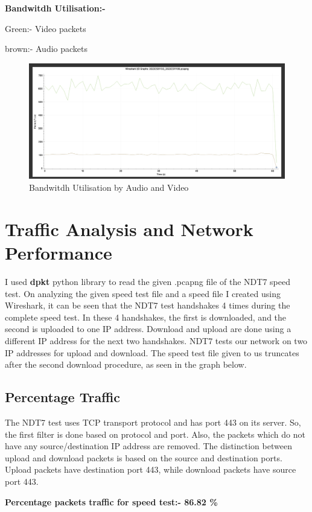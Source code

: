\documentclass{article}
\begin{document}
\textbf{Bandwitdh Utilisation:-}

Green:- Video packets

brown:- Audio packets

    \begin{figure}[H]
    \centering
    \includegraphics[width=\textwidth]{bandwitdh_graph.png}
    \caption*{Bandwitdh Utilisation by Audio and Video}
    \end{figure}
    
\newpage

\section{Traffic Analysis and Network Performance}
I used \textbf{dpkt} python library to read the given .pcapng file of the NDT7 speed test. On analyzing the given speed test file and a speed file I created using Wireshark, it can be seen that the NDT7 test handshakes 4 times during the complete speed test. In these 4 handshakes, the first is downloaded, and the second is uploaded to one IP address. Download and upload are done using a different IP address for the next two handshakes. NDT7 tests our network on two IP addresses for upload and download. The speed test file given to us truncates after the second download procedure, as seen in the graph below.
\subsection{Percentage Traffic}
The NDT7 test uses TCP transport protocol and has port 443 on its server. So, the first filter is done based on protocol and port. Also, the packets which do not have any source/destination IP address are removed. The distinction between upload and download packets is based on the source and destination ports. Upload packets have destination port 443, while download packets have source port 443.


\textbf{Percentage packets traffic for speed test:- 86.82 \%}
\end{document}
